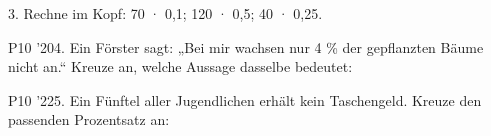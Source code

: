 \documentclass[11pt]{article}
\begin{document}
\begin{pfaufg}{}{3.}{}
Rechne im Kopf: 70 · 0,1; 120 · 0,5; 40 · 0,25.
\end{pfaufg}
\pfgruppe{}
\begin{pfaufg}{P10 ’20}{4.}{}
Ein Förster sagt: „Bei mir wachsen nur 4 \% der gepflanzten Bäume nicht an.“ Kreuze an, welche Aussage dasselbe bedeutet:
\end{pfaufg}
\pfgruppe{}
\begin{pfaufg}{P10 ’22}{5.}{}
Ein Fünftel aller Jugendlichen erhält kein Taschengeld. Kreuze den passenden Prozentsatz an:
\end{pfaufg}
\end{document}

